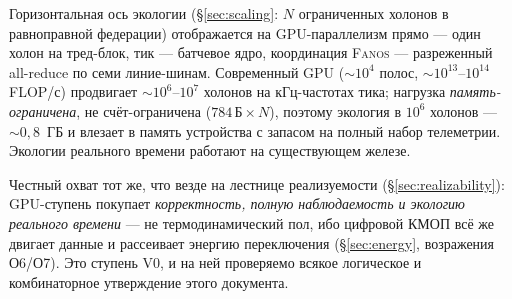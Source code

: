 \begin{claimbox}
Горизонтальная ось экологии (\S\ref{sec:scaling}: $N$ ограниченных холонов в
равноправной федерации) отображается на GPU-параллелизм прямо --- один холон на
тред-блок, тик --- батчевое ядро, координация \textsc{Fanos} --- разреженный
all-reduce по семи линие-шинам. Современный GPU (${\sim}10^4$ полос,
${\sim}10^{13}$--$10^{14}$ FLOP/с) продвигает ${\sim}10^{6}$--$10^{7}$ холонов
на кГц-частотах тика; нагрузка \emph{память-ограничена}, не счёт-ограничена
($784\,\mathrm{Б}\times N$), поэтому экология в $10^{6}$ холонов ---
${\sim}0{,}8$~ГБ и влезает в память устройства с запасом на полный набор
телеметрии. Экологии реального времени работают на существующем железе.
\end{claimbox}

\noindent Честный охват тот же, что везде на лестнице реализуемости
(\S\ref{sec:realizability}): GPU-ступень покупает \emph{корректность, полную
наблюдаемость и экологию реального времени} --- не термодинамический пол, ибо
цифровой КМОП всё же двигает данные и рассеивает энергию переключения
(\S\ref{sec:energy}, возражения О6/О7). Это ступень V0, и на ней проверяемо
всякое логическое и комбинаторное утверждение этого документа.

